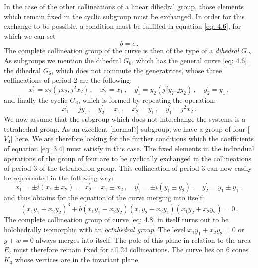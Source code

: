 \documentclass[leqno]{article}
\begin{document}
In the case of the other collineations of a linear dihedral group, those elements which remain fixed in the cyclic subgroup must be exchanged. In order for this exchange to be possible, a condition must be fulfilled in equation \eqref{eq: 4.6}, for which we can set 
\begin{equation}\label{eq: 4.7}
b=c \, . \tag{7}
\end{equation}
The complete collineation group of the curve is then of the type of a \textit{dihedral} $G_{12}$. As subgroups we mention the dihedral $G_6$, which has the general curve \eqref{eq: 4.6}, the dihedral $G_6$, which does not commute the generatrices, whose three collineations of period 2 are the following: 
\[
x_1^\prime = x_2( jx_2, j^2 x_2) \, , \quad x_2^\prime = x_1 \, , \quad y_1^\prime = y_2(j^2 y_2, j y_2) \, , \quad y_2^\prime = y_1 \, , 
\] 
and finally the cyclic $G_6$, which is formed by repeating the operation: 
\[
x_1^\prime = j y_2 \, , \quad y_2^\prime = x_1 \, , \quad x_2^\prime = y_1 \, , \quad y_1^\prime = j^2 x_2 \, . 
\]
We now assume that the subgroup which does not interchange the systems is a tetrahedral group. As an excellent [normal?] subgroup, we have a group of four [$V_4$] here. We are therefore looking for the further conditions which the coefficients of equation \eqref{eq: 3.4} must satisfy in this case. The fixed elements in the individual operations of the group of four are to be cyclically exchanged in the collineations of period 3 of the tetrahedron group. This collineation of period 3 can now easily be represented in the following way:
\[
x_1^\prime = \pm i(x_1 \pm x_2) \, , \quad x_2^\prime = x_1 \pm x_2 \, , \quad y_1^\prime = \pm i (y_1 \pm y_2) \, , \quad y_2^\prime = y_1 \pm y_1 \, , 
\]
and thus obtains for the equation of the curve merging into itself:
\begin{equation}\label{eq: 4.8}
(x_1 y_1 + x_2 y_2)^3 + b(x_1 y_1 - x_2 y_2) (x_1 y_2 - x_2 y_1)( x_1 y_2 + x_2 y_2) = 0 \, . \tag{8}
\end{equation}
The complete collineation group of curve \eqref{eq: 4.8} in itself turns out to be holohedrally isomorphic with an \textit{octahedral group}. The level $x_1 y_1 + x_2 y_2 = 0$ or $y+w=0$ always merges into itself. The pole of this plane in relation to the area $F_2$ must therefore remain fixed for all 24 collineations. The curve lies on 6 cones $K_3$ whose vertices are in the invariant plane.
\end{document}

